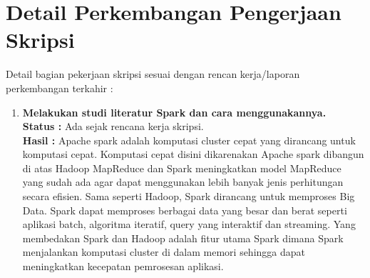 \documentclass[a4paper,twoside]{article}
\begin{document}
\section{Detail Perkembangan Pengerjaan Skripsi}
Detail bagian pekerjaan skripsi sesuai dengan rencan kerja/laporan perkembangan terkahir :
	\begin{enumerate}
		\item \textbf{Melakukan studi literatur Spark dan cara menggunakannya.}\\
		{\bf Status :} Ada sejak rencana kerja skripsi.\\
		{\bf Hasil :} 
		Apache spark adalah komputasi cluster cepat yang dirancang untuk komputasi cepat. Komputasi cepat disini dikarenakan Apache spark dibangun di atas Hadoop MapReduce dan Spark meningkatkan model MapReduce yang sudah ada agar dapat menggunakan lebih banyak jenis perhitungan secara efisien. Sama seperti Hadoop, Spark dirancang untuk memproses Big Data. Spark dapat memproses berbagai data yang besar dan berat seperti aplikasi batch, algoritma iteratif, query yang interaktif dan streaming. Yang membedakan Spark dan Hadoop adalah fitur utama Spark dimana Spark menjalankan komputasi cluster di dalam memori sehingga dapat meningkatkan kecepatan pemrosesan aplikasi. 
		

\end{enumerate}
\end{document}
